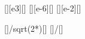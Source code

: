 [\kilo\volt][e3][\V]
[\micro\meter][e-6][\m]
[\cm][e-2][\m]

[]{\nchX/sqrt(2*\ncmeX*\nceX*\UX)}[\m]
[]{\laX*\LsX/\dsX}[\m]
